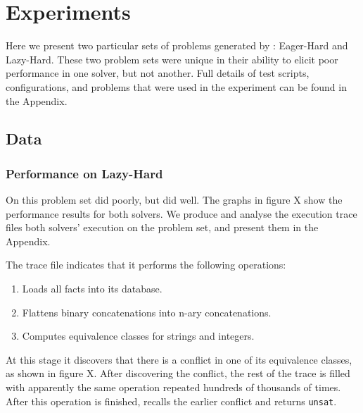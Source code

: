 \section{Experiments}

    Here we present two particular sets of problems generated by \fuzzer{}: Eager-Hard and Lazy-Hard. These two problem sets were unique in their ability to elicit poor performance in one solver, but not another. Full details of test scripts, configurations, and problems that were used in the experiment can be found in the Appendix.


    \subsection{Data}

        \subsubsection{Performance on Lazy-Hard}

            On this problem set \cvc{} did poorly, but \us{} did well. The graphs in figure X show the performance results for both solvers. We produce and analyse the execution trace files both solvers' execution on the problem set, and present them in the Appendix.

            The \cvc{} trace file indicates that it performs the following operations:

            \begin{enumerate}
                \item Loads all facts into its database.
                \item Flattens binary concatenations into n-ary concatenations.
                \item Computes equivalence classes for strings and integers.
            \end{enumerate}

            At this stage it discovers that there is a conflict in one of its equivalence classes, as shown in figure X. After discovering the conflict, the rest of the trace is filled with apparently the same operation repeated hundreds of thousands of times. After this operation is finished, \cvc{} recalls the earlier conflict and returns \texttt{unsat}.

